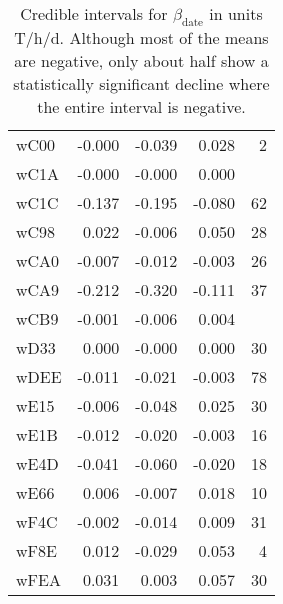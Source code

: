 \begin{table}[ht]
\begin{tabular}{lrrrr}
  wC00 & -0.000 & -0.039 & 0.028 &    2 \\ 
  wC1A & -0.000 & -0.000 & 0.000 &  \\ 
  wC1C & -0.137 & -0.195 & -0.080 &   62 \\ 
  wC98 & 0.022 & -0.006 & 0.050 &   28 \\ 
  wCA0 & -0.007 & -0.012 & -0.003 &   26 \\ 
  wCA9 & -0.212 & -0.320 & -0.111 &   37 \\ 
  wCB9 & -0.001 & -0.006 & 0.004 &  \\ 
  wD33 & 0.000 & -0.000 & 0.000 &   30 \\ 
  wDEE & -0.011 & -0.021 & -0.003 &   78 \\ 
  wE15 & -0.006 & -0.048 & 0.025 &   30 \\ 
  wE1B & -0.012 & -0.020 & -0.003 &   16 \\ 
  wE4D & -0.041 & -0.060 & -0.020 &   18 \\ 
  wE66 & 0.006 & -0.007 & 0.018 &   10 \\ 
  wF4C & -0.002 & -0.014 & 0.009 &   31 \\ 
  wF8E & 0.012 & -0.029 & 0.053 &    4 \\ 
  wFEA & 0.031 & 0.003 & 0.057 &   30 \\ 
   \hline
\end{tabular}
\endgroup
\caption{Credible intervals for $\beta_\text{date}$ in units T/h/d. Although most of the means are negative, only about half show a statistically significant decline where the entire interval is negative.} 
\label{tab:beta_date_all}
\end{table}
